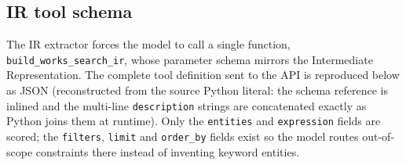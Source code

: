 \subsection*{IR tool schema}

The IR extractor forces the model to call a single function,
\lstinline|build_works_search_ir|, whose parameter schema mirrors the
Intermediate Representation. The complete tool definition sent to the API is
reproduced below as JSON (reconstructed from the source Python literal: the
schema reference is inlined and the multi-line \lstinline|description| strings
are concatenated exactly as Python joins them at runtime). Only the
\lstinline|entities| and \lstinline|expression| fields are scored; the
\lstinline|filters|, \lstinline|limit| and \lstinline|order_by| fields exist so
the model routes out-of-scope constraints there instead of inventing keyword
entities.

